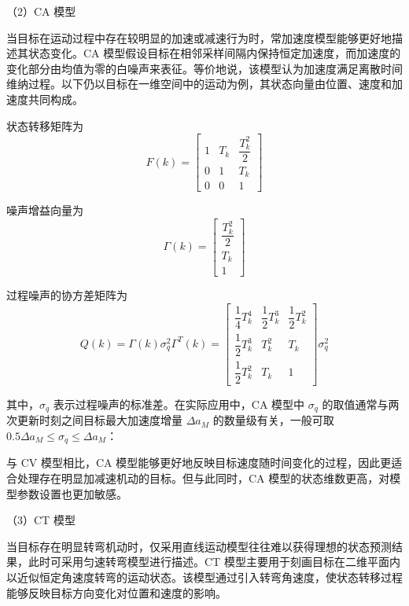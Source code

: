 \documentclass{xdupgthesis}
\begin{document}
\textnormal{（2）CA 模型}\par\vspace{0.3\baselineskip}

当目标在运动过程中存在较明显的加速或减速行为时，常加速度模型能够更好地描述其状态变化。CA 模型假设目标在相邻采样间隔内保持恒定加速度，而加速度的变化部分由均值为零的白噪声来表征。等价地说，该模型认为加速度满足离散时间维纳过程。以下仍以目标在一维空间中的运动为例，其状态向量由位置、速度和加速度共同构成。

状态转移矩阵为
\begin{equation}
	F(k)=
	\begin{bmatrix}
		1 & T_k & \dfrac{T_k^2}{2}\\
		0 & 1   & T_k\\
		0 & 0   & 1
	\end{bmatrix}
\end{equation}

噪声增益向量为
\begin{equation}
	\Gamma(k)=
	\begin{bmatrix}
		\dfrac{T_k^2}{2}\\
		T_k\\
		1
	\end{bmatrix}
\end{equation}

过程噪声的协方差矩阵为
\begin{equation}
	Q(k)=\Gamma(k)\sigma_q^2\Gamma^{T}(k)=
	\begin{bmatrix}
		\dfrac{1}{4}T_k^4 & \dfrac{1}{2}T_k^3 & \dfrac{1}{2}T_k^2\\[6pt]
		\dfrac{1}{2}T_k^3 & T_k^2 & T_k\\[6pt]
		\dfrac{1}{2}T_k^2 & T_k & 1
	\end{bmatrix}\sigma_q^2
\end{equation}

其中，$\sigma_q$ 表示过程噪声的标准差。在实际应用中，CA 模型中 $\sigma_q$ 的取值通常与两次更新时刻之间目标最大加速度增量 $\Delta a_M$ 的数量级有关，一般可取\(0.5\Delta a_M \leq \sigma_q \leq \Delta a_M\)\cite{barshalom2004estimation}：

与 CV 模型相比，CA 模型能够更好地反映目标速度随时间变化的过程，因此更适合处理存在明显加减速机动的目标。但与此同时，CA 模型的状态维数更高，对模型参数设置也更加敏感。

\textnormal{（3）CT 模型}\par\vspace{0.3\baselineskip}

当目标存在明显转弯机动时，仅采用直线运动模型往往难以获得理想的状态预测结果，此时可采用匀速转弯模型进行描述。CT 模型主要用于刻画目标在二维平面内以近似恒定角速度转弯的运动状态。该模型通过引入转弯角速度，使状态转移过程能够反映目标方向变化对位置和速度的影响。
\end{document}

